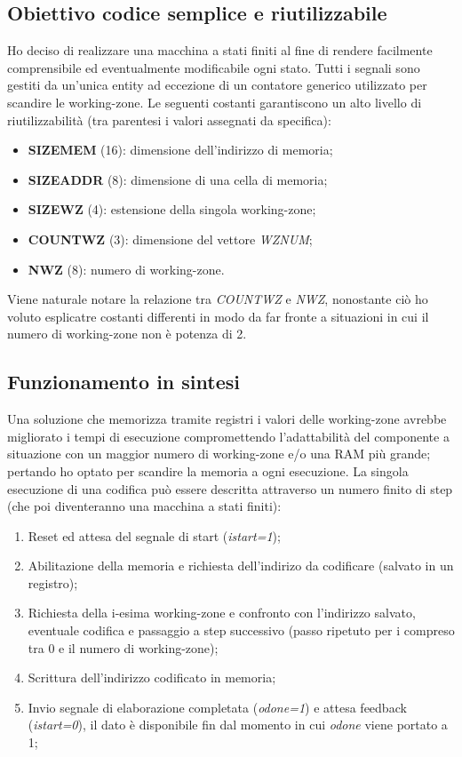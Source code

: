 \documentclass{article}
\begin{document}
\subsection{Obiettivo codice semplice e riutilizzabile}
Ho deciso di realizzare una macchina a stati finiti al fine di rendere facilmente comprensibile ed eventualmente modificabile ogni stato.
Tutti i segnali sono gestiti da un'unica entity ad eccezione di un contatore generico utilizzato per scandire le working-zone.
Le seguenti costanti garantiscono un alto livello di riutilizzabilità (tra parentesi i valori assegnati da specifica):
\begin{itemize}
	\item \textbf{SIZE\textunderscore MEM} (16): dimensione dell'indirizzo di memoria;
	\item \textbf{SIZE\textunderscore ADDR} (8): dimensione di una cella di memoria;
	\item \textbf{SIZE\textunderscore WZ} (4): estensione della singola working-zone;
	\item \textbf{COUNT\textunderscore WZ} (3): dimensione del vettore \textit{WZ\textunderscore NUM};
	\item \textbf{N\textunderscore WZ} (8): numero di working-zone.
\end{itemize}
Viene naturale notare la relazione tra \textit{COUNT\textunderscore WZ} e \textit{N\textunderscore WZ}, nonostante ciò ho voluto esplicatre costanti differenti in modo da far fronte a situazioni in cui il numero di working-zone non è potenza di 2.
\subsection{Funzionamento in sintesi}
Una soluzione che memorizza tramite registri i valori delle working-zone avrebbe migliorato i tempi di esecuzione compromettendo l'adattabilità del componente a situazione con un maggior numero di working-zone e/o una RAM più grande; pertando ho optato per scandire la memoria a ogni esecuzione.
La singola esecuzione di una codifica può essere descritta attraverso un numero finito di step (che poi diventeranno una macchina a stati finiti):
\begin{enumerate}
	\item Reset ed attesa del segnale di start (\textit{i\textunderscore start=1});
	\item Abilitazione della memoria e richiesta dell'indirizo da codificare (salvato in un registro);
	\item Richiesta della i-esima working-zone e confronto con l'indirizzo salvato, eventuale codifica e passaggio a step successivo (passo ripetuto per i compreso tra 0 e il numero di working-zone);
	\item Scrittura dell'indirizzo codificato in memoria;
	\item Invio segnale di elaborazione completata (\textit{o\textunderscore done=1}) e attesa feedback (\textit{i\textunderscore start=0}), il dato è disponibile fin dal momento in cui \textit{o\textunderscore done} viene portato a 1;
\end{enumerate}
\end{document}

